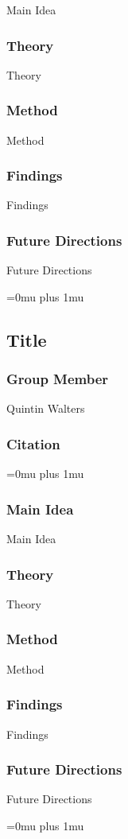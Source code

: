 \noindent
Main Idea

\subsubsection{Theory}

\noindent
Theory

\subsubsection{Method}

\noindent
Method

\subsubsection{Findings}

\noindent
Findings

\subsubsection{Future Directions}

\noindent
Future Directions 

\Urlmuskip=0mu plus 1mu\relax

\noindent
\subsection{Title}

\subsubsection{Group Member}

\noindent
Quintin Walters

\noindent
\subsubsection{Citation}

\Urlmuskip=0mu plus 1mu\relax

\subsubsection{Main Idea}

\noindent
Main Idea

\subsubsection{Theory}

\noindent
Theory

\subsubsection{Method}

\noindent
Method

\subsubsection{Findings}

\noindent
Findings

\subsubsection{Future Directions}

\noindent
Future Directions 

\Urlmuskip=0mu plus 1mu\relax
\pagebreak
